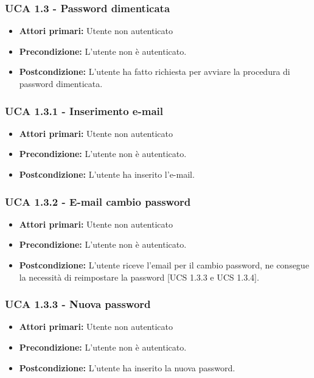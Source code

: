 \subsubsection{UCA 1.3 - Password dimenticata}%
\begin{itemize}
\item \textbf{Attori primari:} Utente non autenticato
\item \textbf{Precondizione:}  L'utente non è autenticato.
\item \textbf{Postcondizione:} L'utente ha fatto richiesta per avviare la procedura di password dimenticata.
\end{itemize}

\subsubsection{UCA 1.3.1 - Inserimento e-mail}
\begin{itemize}
\item \textbf{Attori primari:} Utente non autenticato
\item \textbf{Precondizione:} L'utente non è autenticato. %
\item \textbf{Postcondizione:} L'utente ha inserito l'e-mail.
\end{itemize}

\subsubsection{UCA 1.3.2 - E-mail cambio password}
\begin{itemize}
\item \textbf{Attori primari:} Utente non autenticato
\item \textbf{Precondizione:} L'utente non è autenticato.
\item \textbf{Postcondizione:} L'utente riceve l'email per il cambio password, ne consegue la necessità di reimpostare la password [UCS 1.3.3 e UCS 1.3.4].
\end{itemize}

\subsubsection{UCA 1.3.3 - Nuova password}
\begin{itemize}
\item \textbf{Attori primari:} Utente non autenticato
\item \textbf{Precondizione:}  L'utente non è autenticato.
\item \textbf{Postcondizione:} L'utente ha inserito la nuova password.
\end{itemize}

